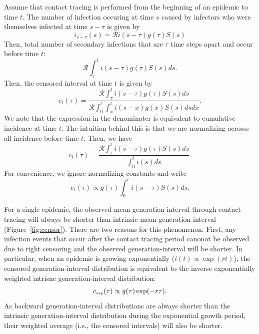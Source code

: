 \documentclass[12pt]{article}
\newcommand{\RR}{\ensuremath{{\mathcal R}}}
\newcommand{\tsub}[2]{#1_{{\textrm{\tiny #2}}}}
\begin{document}
Assume that contact tracing is performed from the beginning of an epidemic to time $t$.
The number of infection occuring at time $s$ caused by infectors who were themselves infected at time $s-\tau$ is given by
\begin{equation}
i_{s-\tau}(s) = \RR i(s-\tau) g(\tau) S(s)
\end{equation}
Then, total number of secondary infections that are $\tau$ time steps apart and occur before time $t$:
\begin{equation}
\RR \int_\tau^t i(s-\tau) g(\tau) S(s) ds.
\end{equation}
Then, the censored interval at time $t$ is given by
\begin{equation}
c_t(\tau)= \frac{\RR \int_\tau^t i(s-\tau) g(\tau) S(s) ds}{\RR \int_0^t \int_x^t i(s-x) g(x) S(s) ds dx}.
\end{equation}
We note that the expression in the denominater is equivalent to cumulative incidence at time $t$.
The intuition behind this is that we are normalizing acrosss all incidence before time $t$.
Then, we have
\begin{equation}
c_t(\tau) = \frac{\RR \int_\tau^t i(s-\tau) g(\tau) S(s) ds}{\int_0^t i(s) ds}.
\end{equation}
For convenience, we ignore normalizing constants and write
\begin{equation}\label{eq:obsg}
c_t(\tau) \propto g(\tau) \int_{0}^t i(s-\tau) S(s) ds.
\end{equation}

For a single epidemic, the observed mean generation interval through contact tracing will always be shorter than intrinsic mean generation interval (Figure~\ref{fig:censor}).
There are two reasons for this phenomenon.
First, any infection events that occur after the contact tracing period canonot be observed due to right censoring and the observed generation-interval will be shorter.
In particular, when an epidemic is growing exponentially ($i(t) \propto \exp(rt)$), 
the censored generation-interval distribution is equivalent to the inverse exponentially weighted intrisnc generation-interval distribution:
\begin{equation}
\tsub{c}{exp}(\tau) \propto g(\tau) \exp(-r\tau).
\end{equation}
As backward generation-interval distributions are always shorter than the intrinsic generation-interval distribution during the exponential growth period, their weighted average (i.e., the censored intervals) will also be shorter.
\end{document}
